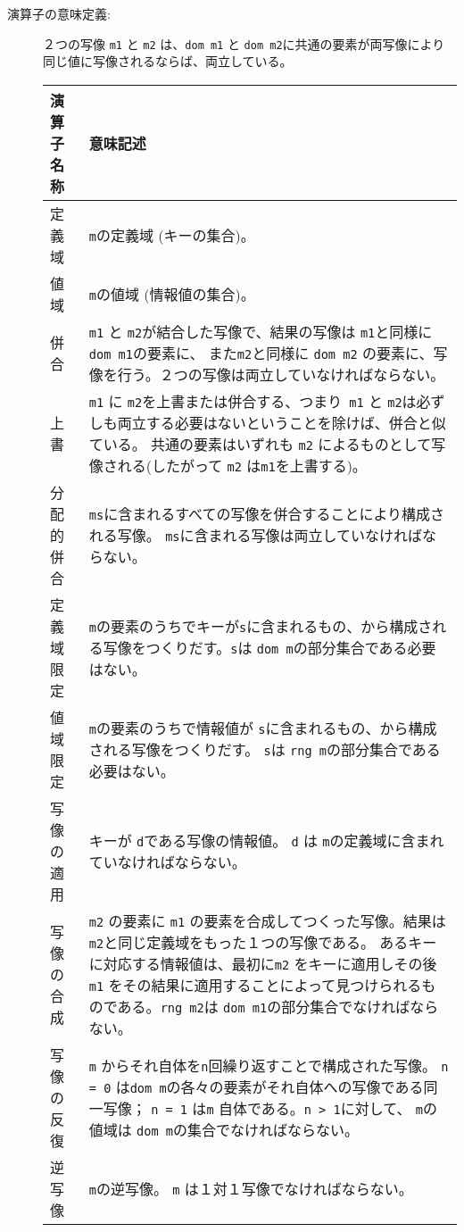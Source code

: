 \documentclass[\pformat,12pt]{jarticle}
\newenvironment{TypeSemantics}{\begin{longtable}[r]{|p{3.5cm}|p{9cm}|}\hline%
  演算子名称 & 意味記述 \\ \hline\hline \endhead}%
  {\hline\end{longtable}}
\begin{document}
\begin{description}
\item[演算子の意味定義:] ２つの写像 {\tt m1} と {\tt m2} は、{\tt dom m1} と {\tt dom m2}に共通の要素が両写像により同じ値に写像されるならば、両立している。

\vspace{1ex}
\begin{TypeSemantics}
定義域 & {\tt m}の定義域 (キーの集合)。 \\ \hline
値域 & {\tt m}の値域 (情報値の集合)。  \\ \hline
併合 &  {\tt m1} と {\tt m2}が結合した写像で、結果の写像は  {\tt m1}と同様に{\tt dom m1}の要素に、 また{\tt m2}と同様に {\tt dom m2} の要素に、写像を行う。２つの写像は両立していなければならない。 \\ \hline
上書 &  {\tt m1} に {\tt m2}を上書または併合する、つまり\  {\tt m1} と {\tt m2}は必ずしも両立する必要はないということを除けば、併合と似ている。
共通の要素はいずれも {\tt m2} によるものとして写像される(したがって {\tt m2} は{\tt m1}を上書する)。 \\ \hline
分配的併合 &  {\tt ms}に含まれるすべての写像を併合することにより構成される写像。 {\tt ms}に含まれる写像は両立していなければならない。 \\ \hline
定義域限定 & {\tt m}の要素のうちでキーが{\tt s}に含まれるもの、から構成される写像をつくりだす。{\tt s}は {\tt dom m}の部分集合である必要はない。 \\ \hline
値域限定 & {\tt m}の要素のうちで情報値が {\tt s}に含まれるもの、から構成される写像をつくりだす。 {\tt s}は {\tt rng m}の部分集合である必要はない。 \\ \hline
写像の適用 & キーが {\tt d}である写像の情報値。 {\tt d} は {\tt m}の定義域に含まれていなければならない。 \\ \hline
写像の合成 &  {\tt  m2} の要素に {\tt m1} の要素を合成してつくった写像。結果は {\tt m2}と同じ定義域をもった１つの写像である。 あるキーに対応する情報値は、最初に{\tt m2} をキーに適用しその後 {\tt m1} をその結果に適用することによって見つけられるものである。{\tt rng m2}は {\tt  dom m1}の部分集合でなければならない。 \\ \hline
写像の反復 &  {\tt m} からそれ自体を{\tt n}回繰り返すことで構成された写像。 {\tt n = 0} は{\tt dom m}の各々の要素がそれ自体への写像である同一写像； {\tt n = 1} は{\tt m} 自体である。{\tt n > 1}に対して、 {\tt m}の値域は {\tt dom m}の集合でなければならない。\\ \hline
逆写像 & {\tt m}の逆写像。 {\tt m} は１対１写像でなければならない。 \\ \hline
\end{TypeSemantics}


\end{description}
\end{document}
